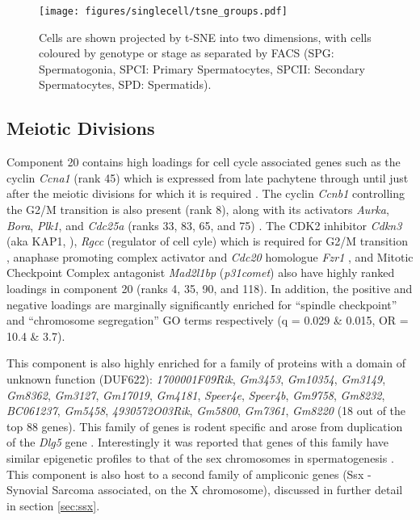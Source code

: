\begin{figure}[H]
	\centering
	\texttt{[image: figures/singlecell/tsne\_groups.pdf]}
	\caption[Experimental groups in t-SNE space]{
		Cells are shown projected by t-SNE into two dimensions, with cells coloured by genotype or stage as separated by FACS (SPG: Spermatogonia, SPCI: Primary Spermatocytes, SPCII: Secondary Spermatocytes, SPD: Spermatids).
	}
	\label{fig:tsneGroups}
\end{figure}



\subsection{Meiotic Divisions}
Component 20 contains high loadings for cell cycle associated genes such as the cyclin \textit{Ccna1} (rank 45) which is expressed from late pachytene through until just after the meiotic divisions \parencite{Sweeney1996distinct} for which it is required \parencite{Liu1998Cyclin}. The cyclin \textit{Ccnb1} controlling the G2/M transition is also present (rank 8), along with its activators \textit{Aurka}, \textit{Bora}, \textit{Plk1}, and \textit{Cdc25a} (ranks 33, 83, 65, and 75) \parencite[reviewed in][]{Joukov2018AuroraPLK1}. The CDK2 inhibitor \textit{Cdkn3} (aka KAP1, \parencite{Poon1995Dephosphorylation}), \textit{Rgcc} (regulator of cell cyle) which is required for G2/M transition \parencite{Saigusa2007RGC32}, anaphase promoting complex activator and \textit{Cdc20} homologue \textit{Fzr1} \parencite{Holt2014APC}, and Mitotic Checkpoint Complex antagonist \textit{Mad2l1bp} (\textit{p31comet}) \parencite{Habu2002Identification} also have highly ranked loadings in component 20 (ranks 4, 35, 90, and 118). In addition, the positive and negative loadings are marginally significantly enriched for ``spindle checkpoint'' and ``chromosome segregation'' GO terms respectively (q = 0.029 \& 0.015, OR = 10.4 \& 3.7).

This component is also highly enriched for a family of proteins with a domain of unknown function (DUF622): \textit{1700001F09Rik}, \textit{Gm3453}, \textit{Gm10354}, \textit{Gm3149}, \textit{Gm8362}, \textit{Gm3127}, \textit{Gm17019}, \textit{Gm4181}, \textit{Speer4e}, \textit{Speer4b}, \textit{Gm9758}, \textit{Gm8232}, \textit{BC061237}, \textit{Gm5458}, \textit{4930572O03Rik}, \textit{Gm5800}, \textit{Gm7361}, \textit{Gm8220} (18 out of the top 88 genes). This family of genes is rodent specific and arose from duplication of the \textit{Dlg5} gene \parencite{Church2009Lineagespecific}. Interestingly it was reported that genes of this family have similar epigenetic profiles to that of the sex chromosomes in spermatogenesis \parencite{Moretti2016Expression}. This component is also host to a second family of ampliconic genes (Ssx - Synovial Sarcoma associated, on the X chromosome), discussed in further detail in section \ref{sec:ssx}.

